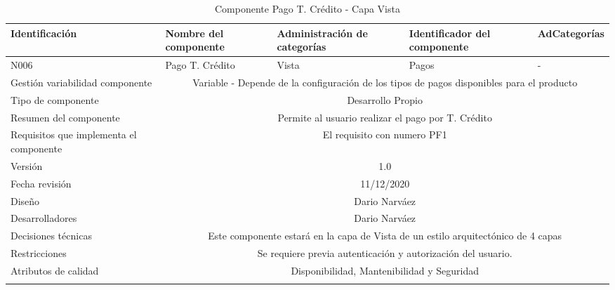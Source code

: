 \documentclass[10pt,a4paper,openany]{book}
\begin{document}
\begin{longtable}{|p{3cm}|p{3cm}|p{3cm}|p{3cm}|p{3cm}|} \hline
Identificación & Nombre del componente & Administración de categorías & Identificador del componente & AdCategorías \\[0.5ex] \hline
N006& Pago T. Crédito& Vista& Pagos& -\\[0.5ex] \hline
Gestión variabilidad componente & \multicolumn{4}{|c|}{{Variable - Depende de la configuración de los tipos de pagos disponibles para el producto}} \\ \hline
Tipo de componente & \multicolumn{4}{|c|}{Desarrollo Propio} \\ \hline
Resumen del componente & \multicolumn{4}{|c|}{Permite al usuario realizar el pago por T. Crédito} \\ \hline
Requisitos que implementa el componente & \multicolumn{4}{|c|}{El requisito con numero PF1 } \\ \hline
Versión & \multicolumn{4}{|c|}{1.0 } \\ \hline
Fecha revisión & \multicolumn{4}{|c|}{ 11/12/2020} \\ \hline
Diseño & \multicolumn{4}{|c|}{Dario Narváez} \\ \hline
Desarrolladores & \multicolumn{4}{|c|}{Dario Narváez} \\ \hline
Decisiones técnicas & \multicolumn{4}{|c|}{Este componente estará en la capa de Vista de un estilo arquitectónico de 4 capas  } \\ \hline
Restricciones & \multicolumn{4}{|c|}{Se requiere previa autenticación y autorización del usuario.} \\ \hline
Atributos de calidad & \multicolumn{4}{|c|}{Disponibilidad, Mantenibilidad y Seguridad} \\ \hline
\caption{Componente Pago T. Crédito - Capa Vista}
\label{table:t6}
\end{longtable}


\medskip


\end{document}
